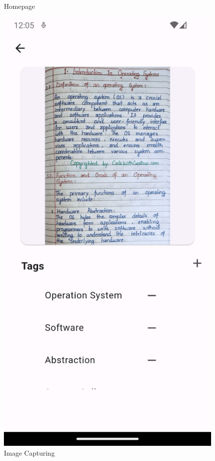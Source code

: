 \begin{enumerate}
\begin{figure}[h!]
        \caption{Homepage}
    \end{figure}
    \begin{figure}[h!]
        \centering
        \includegraphics[scale=0.3]{output/add.png}
        \caption{Image Capturing }
    \end{figure}
\end{enumerate}
\newpage
